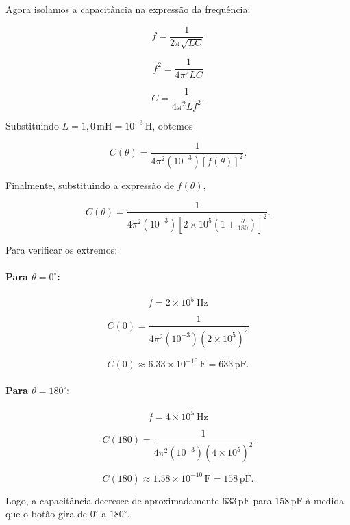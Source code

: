Agora isolamos a capacitância na expressão da frequência:

\[
f=\frac{1}{2\pi\sqrt{LC}}
\]

\[
f^2=\frac{1}{4\pi^2LC}
\]

\[
C=\frac{1}{4\pi^2Lf^2}.
\]

Substituindo \(L=1,0\,\text{mH}=10^{-3}\,\text{H}\), obtemos

\[
C(\theta)=
\frac{1}
{4\pi^2(10^{-3})[f(\theta)]^2}.
\]

Finalmente, substituindo a expressão de \(f(\theta)\),

\[
\boxed{
C(\theta)=
\frac{1}
{4\pi^2(10^{-3})
\left[
2\times10^5
\left(1+\frac{\theta}{180}\right)
\right]^2}
}.
\]

Para verificar os extremos:

\paragraph{Para \(\theta=0^\circ\):}

\[
f=2\times10^5\ \text{Hz}
\]

\[
C(0)=
\frac{1}
{4\pi^2(10^{-3})(2\times10^5)^2}
\]

\[
C(0)\approx6.33\times10^{-10}\,\text{F}
=633\,\text{pF}.
\]

\paragraph{Para \(\theta=180^\circ\):}

\[
f=4\times10^5\ \text{Hz}
\]

\[
C(180)=
\frac{1}
{4\pi^2(10^{-3})(4\times10^5)^2}
\]

\[
C(180)\approx1.58\times10^{-10}\,\text{F}
=158\,\text{pF}.
\]

Logo, a capacitância decresce de aproximadamente \(633\,\text{pF}\) para \(158\,\text{pF}\) à medida que o botão gira de \(0^\circ\) a \(180^\circ\).

\vspace{1cm}
